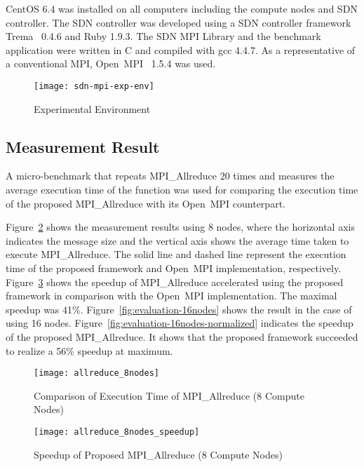 CentOS 6.4 was installed on all computers including the compute nodes and
SDN controller. The SDN controller was developed using a SDN controller
framework Trema~\autocite{trema} 0.4.6 and Ruby 1.9.3. The SDN
MPI Library and the benchmark application were written in C and
compiled with gcc 4.4.7. As a representative of a conventional MPI,
Open~MPI~\autocite{Gabriel2004} 1.5.4 was used.

\begin{figure}
    \centering
    \texttt{[image: sdn-mpi-exp-env]}
    \caption{Experimental Environment}%
    \label{fig:experiment-environment}
\end{figure}

\subsection{Measurement Result}

A micro-benchmark that repeats MPI\_Allreduce 20
times and measures the average execution time of the function was used
for comparing the execution time of the proposed MPI\_Allreduce
with its Open~MPI counterpart.

Figure~\ref{fig:evaluation-8nodes} shows the measurement results using 8
nodes, where the horizontal axis indicates the message size and the
vertical axis shows the average time taken to execute
MPI\_Allreduce. The solid line and dashed line represent the
execution time of the proposed framework and Open~MPI implementation,
respectively. Figure~\ref{fig:evaluation-8nodes-normalized} shows the speedup
of MPI\_Allreduce accelerated using the proposed framework in comparison with
the Open~MPI implementation. The maximal speedup was 41\%.
Figure~\ref{fig:evaluation-16nodes} shows the result in the case of using 16
nodes. Figure~\ref{fig:evaluation-16nodes-normalized} indicates the speedup of
the proposed MPI\_Allreduce. It shows that the proposed framework succeeded to
realize a 56\% speedup at maximum.

\begin{figure}
    \centering
    \texttt{[image: allreduce\_8nodes]}
    \caption{Comparison of Execution Time of MPI\_Allreduce (8 Compute Nodes)}%
    \label{fig:evaluation-8nodes}
\end{figure}

\begin{figure}
    \centering
    \texttt{[image: allreduce\_8nodes\_speedup]}
    \caption{Speedup of Proposed MPI\_Allreduce (8 Compute Nodes)}%
    \label{fig:evaluation-8nodes-normalized}
\end{figure}

